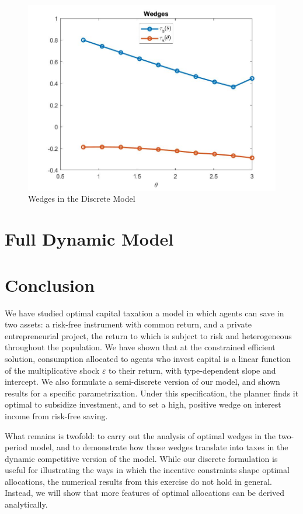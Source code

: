 \documentclass[11pt]{article}
\begin{document}
\begin{figure}[!htbp]
    \centering
    \includegraphics[scale=0.4]{figures/wedges_10.jpg}
    \caption{Wedges in the Discrete Model}
    \label{wedge_disc}
\end{figure}

\section{Full Dynamic Model} \label{dyn_mod}
\section{Conclusion} \label{conc}

We have studied optimal capital taxation a model in which agents can save in two assets: a risk-free instrument with common return, and a private entrepreneurial project, the return to which is subject to risk and heterogeneous throughout the population. We have shown that at the constrained efficient solution, consumption allocated to agents who invest capital is a linear function of the multiplicative shock \( \varepsilon \) to their return, with type-dependent slope and intercept. We also formulate a semi-discrete version of our model, and shown results for a specific parametrization. Under this specification, the planner finds it optimal to subsidize investment, and to set a high, positive wedge on interest income from risk-free saving. 

What remains is twofold: to carry out the analysis of optimal wedges in the two-period model, and to demonstrate how those wedges translate into taxes in the dynamic competitive version of the model. While our discrete formulation is useful for illustrating the ways in which the incentive constraints shape optimal allocations, the numerical results from this exercise do not hold in general. Instead, we will show that more features of optimal allocations can be derived analytically. 
\end{document}

